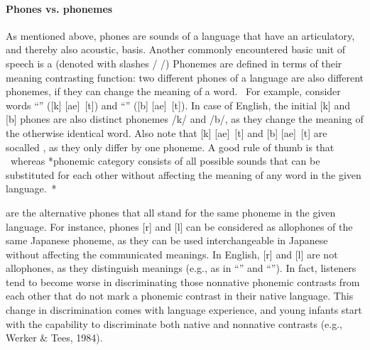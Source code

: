 \documentclass[letterpaper,10pt,english]{jupyterBook}
\begin{document}
\paragraph{Phones vs. phonemes}
\label{\detokenize{Introduction/Linguistic_structure_of_speech:phones-vs-phonemes}}
\sphinxAtStartPar
As mentioned above, phones are sounds of a language that have an
articulatory, and thereby also acoustic, basis. Another commonly
encountered basic unit of speech is a  (denoted with slashes /
/) Phonemes are defined in terms of their meaning contrasting
function: two different phones of a language are also different
phonemes, if they can change the meaning of a word.  For example,
consider words “” ({[}k{]} {[}ae{]} {[}t{]}) and “” ({[}b{]}
{[}ae{]} {[}t{]}). In case of English, the initial {[}k{]} and {[}b{]} phones
are also distinct phonemes /k/ and /b/, as they change the meaning of
the otherwise identical word. Also note that {[}k{]} {[}ae{]} {[}t{]} and
{[}b{]} {[}ae{]} {[}t{]} are so\sphinxhyphen{}called , as they only differ by
one phoneme. A good rule of thumb is that  whereas  *phonemic
category consists of all possible sounds that can be substituted for
each other without affecting the meaning of any word in the given
language. *

\sphinxAtStartPar
{} are the alternative phones that all stand for the same
phoneme in the given language. For instance, phones {[}r{]} and {[}l{]} can
be considered as allophones of the same Japanese phoneme, as they can be
used interchangeable in Japanese without affecting the communicated
meanings. In English, {[}r{]} and {[}l{]} are not allophones, as they
distinguish meanings (e.g., as in “” and “”). In fact,
listeners tend to become worse in discriminating those non\sphinxhyphen{}native
phonemic contrasts from each other that do not mark a phonemic contrast
in their native language. This change in discrimination comes with
language experience, and young infants start with the capability to
discriminate both native and non\sphinxhyphen{}native contrasts (e.g., Werker \& Tees,
1984).
\end{document}
